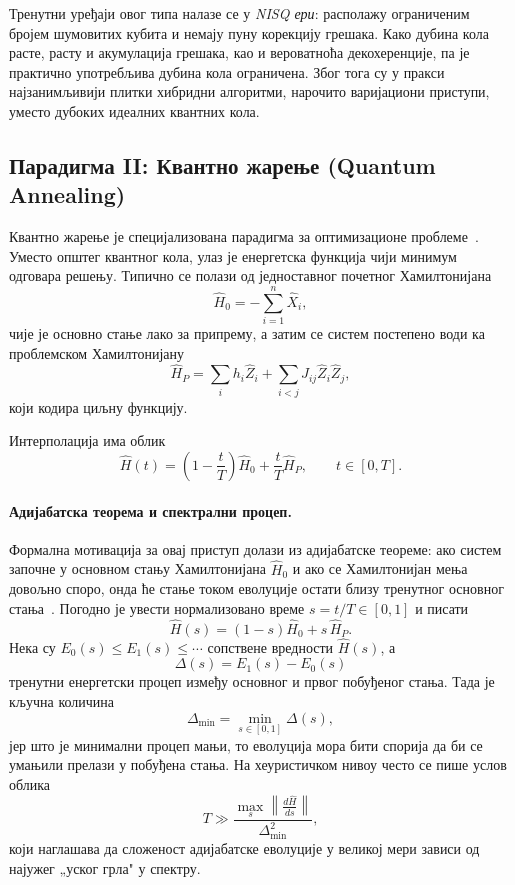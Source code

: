 Тренутни уређаји овог типа налазе се у \textit{NISQ ери}:
располажу ограниченим бројем шумовитих кубита и немају пуну корекцију
грешака. Како дубина кола расте, расту и акумулација грешака, као и
вероватноћа декохеренције, па је практично употребљива дубина кола
ограничена. Због тога су у пракси најзанимљивији
плитки хибридни алгоритми, нарочито варијациони приступи, уместо
дубоких идеалних квантних кола.

\subsection{Парадигма II: Квантно жарење (Quantum Annealing)}

Квантно жарење је специјализована парадигма за оптимизационе проблеме~\cite{mcgeoch2014}.
Уместо општег квантног кола, улаз је енергетска функција чији минимум
одговара решењу. Типично се полази од једноставног почетног
Хамилтонијана
\[
  \hat{H}_0 = -\sum_{i=1}^n \hat{X}_i,
\]
чије је основно стање лако за припрему, а затим се систем постепено
води ка проблемском Хамилтонијану
\[
  \hat{H}_P = \sum_i h_i \hat{Z}_i + \sum_{i<j} J_{ij}\hat{Z}_i \hat{Z}_j,
\]
који кодира циљну функцију.

Интерполација има облик
\[
  \hat{H}(t) = \left(1-\frac{t}{T}\right)\hat{H}_0
             + \frac{t}{T}\hat{H}_P, \qquad t \in [0,T].
\]
\paragraph{Адијабатска теорема и спектрални процеп.}
Формална мотивација за овај приступ долази из адијабатске теореме:
ако систем започне у основном стању Хамилтонијана $\hat{H}_0$ и ако
се Хамилтонијан мења довољно споро, онда ће стање током еволуције
остати близу тренутног основног стања~\cite{mcgeoch2014}.
Погодно је увести нормализовано време $s = t/T \in [0,1]$ и писати
\[
  \hat{H}(s) = (1-s)\hat{H}_0 + s\,\hat{H}_P.
\]
Нека су $E_0(s) \leq E_1(s) \leq \cdots$ сопствене вредности
$\hat{H}(s)$, а
\[
  \Delta(s) = E_1(s) - E_0(s)
\]
тренутни енергетски процеп између основног и првог побуђеног стања.
Тада је кључна количина
\[
  \Delta_{\min} = \min_{s \in [0,1]} \Delta(s),
\]
јер што је минимални процеп мањи, то еволуција мора бити спорија да би
се умањили прелази у побуђена стања. На хеуристичком нивоу често се
пише услов облика
\[
  T \gg \frac{\max_s \left\lVert \frac{d\hat{H}}{ds}\right\rVert}{\Delta_{\min}^2},
\]
који наглашава да сложеност адијабатске еволуције у великој мери
зависи од најужег „уског грла" у спектру.

